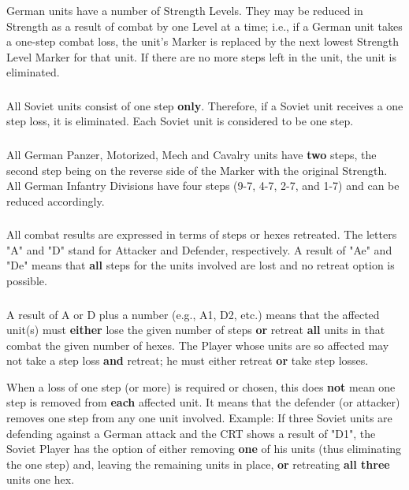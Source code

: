 \subsubsection{} German units have a number of Strength Levels. They may be reduced in Strength as a result of combat by one Level at a time; i.e., if a German unit takes a one-step combat loss, the unit's Marker is replaced by the next lowest Strength Level Marker for that unit. If there are no more steps left in the unit, the unit is eliminated.

\subsubsection{} All Soviet units consist of one step \textbf{only}. Therefore, if a Soviet unit receives a one step loss, it is eliminated. Each Soviet unit is considered to be one step.

\subsubsection{} All German Panzer, Motorized, Mech and Cavalry units have \textbf{two} steps, the second step being on the reverse side of the Marker with the original Strength. All German Infantry Divisions have four steps (9-7, 4-7, 2-7, and 1-7) and can be reduced accordingly.

\subsubsection{} All combat results are expressed in terms of steps or hexes retreated. The letters "A" and "D" stand for Attacker and Defender, respectively. A result of "Ae" and "De" means that \textbf{all} steps for the units involved are lost and no retreat option is possible.

\subsubsection{} A result of A or D plus a number (e.g., A1, D2, etc.) means that the affected unit(s) must \textbf{either} lose the given number of steps \textbf{or} retreat \textbf{all} units in that combat the given number of hexes. The Player whose units are so affected may not take a step loss \textbf{and} retreat; he must either retreat \textbf{or} take step losses.

When a loss of one step (or more) is required or chosen, this does \textbf{not} mean one step is removed from \textbf{each} affected unit. It means that the defender (or attacker) removes one step from any one unit involved. Example: If three Soviet units are defending against a German attack and the CRT shows a result of "D1", the Soviet Player has the option of either removing \textbf{one} of his units (thus eliminating the one step) and, leaving the remaining units in place, \textbf{or} retreating \textbf{all three} units one hex.


